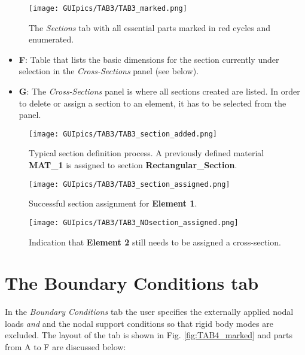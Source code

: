 \begin{appendices}
\begin{figure}
	\centering
	\texttt{[image: GUIpics/TAB3/TAB3\_marked.png]}
	\caption{The \textit{Sections} tab with all essential parts marked in red 
		cycles and enumerated.}
	\label{fig:TAB3_marked}
\end{figure}

\begin{itemize}
	\item \textbf{F}: Table that lists the basic dimensions for the section 
	currently under selection in the \textit{Cross-Sections} panel (see below).
	\item \textbf{G}: The \textit{Cross-Sections} panel is where all sections 
	created are listed. In order to delete or assign a section to an element, 
	it has to be selected from the panel. 
\end{itemize}
\clearpage
\begin{figure}[t]
	\centering
	\texttt{[image: GUIpics/TAB3/TAB3\_section\_added.png]}
	\caption{Typical section definition process. A previously defined material 
		\textbf{MAT\_1} is assigned to section \textbf{Rectangular\_Section}.}
	\label{fig:TAB3_section_added}
\end{figure}

\begin{figure}[b]
	\centering
	\texttt{[image: GUIpics/TAB3/TAB3\_section\_assigned.png]}
	\caption{Successful section assignment for \textbf{Element 1}.}
	\label{fig:TAB3_section_assigned}
\end{figure}
\clearpage
\begin{figure}
	\centering
	\texttt{[image: GUIpics/TAB3/TAB3\_NOsection\_assigned.png]}
	\caption{Indication that \textbf{Element 2} still needs to be assigned a 
		cross-section.}
	\label{fig:TAB3_NOsection_assigned}
\end{figure}

\section*{The Boundary Conditions tab}

In the \textit{Boundary Conditions} tab the user specifies the externally 
applied nodal loads \textit{and} and the nodal support conditions so that rigid 
body modes are excluded. The layout of the tab is shown in Fig. 
\ref{fig:TAB4_marked} and parts 
from A to F are discussed below:


\end{appendices}

